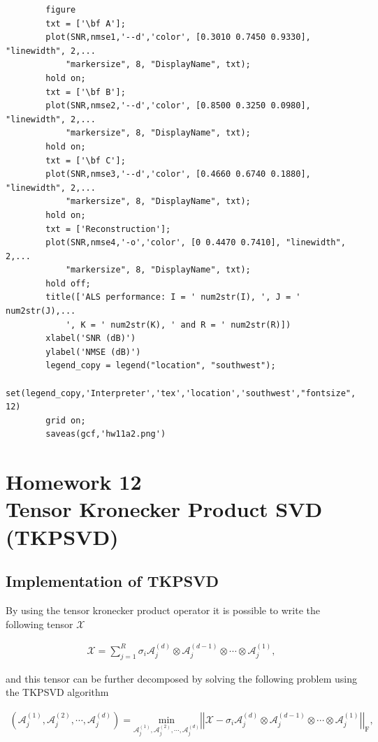 \documentclass[a4paper,10pt]{article}
\begin{document}
\begin{verbatim}
        figure
        txt = ['\bf A'];
        plot(SNR,nmse1,'--d','color', [0.3010 0.7450 0.9330], "linewidth", 2,...
            "markersize", 8, "DisplayName", txt);
        hold on;
        txt = ['\bf B'];
        plot(SNR,nmse2,'--d','color', [0.8500 0.3250 0.0980], "linewidth", 2,...
            "markersize", 8, "DisplayName", txt);
        hold on;
        txt = ['\bf C'];
        plot(SNR,nmse3,'--d','color', [0.4660 0.6740 0.1880], "linewidth", 2,...
            "markersize", 8, "DisplayName", txt);
        hold on;
        txt = ['Reconstruction'];
        plot(SNR,nmse4,'-o','color', [0 0.4470 0.7410], "linewidth", 2,...
            "markersize", 8, "DisplayName", txt);
        hold off;
        title(['ALS performance: I = ' num2str(I), ', J = ' num2str(J),...
            ', K = ' num2str(K), ' and R = ' num2str(R)])
        xlabel('SNR (dB)')
        ylabel('NMSE (dB)')
        legend_copy = legend("location", "southwest");
        set(legend_copy,'Interpreter','tex','location','southwest',"fontsize", 12)
        grid on;
        saveas(gcf,'hw11a2.png')
    \end{verbatim}
    
\newpage
\section*{Homework 12 \\ Tensor Kronecker Product SVD (TKPSVD)}

    \subsection*{Implementation of TKPSVD}

    By using the tensor kronecker product operator it is possible to write the following tensor $\mathcal{X}$

    \begin{align}
        \mathcal{X} = \sum^{R}_{j = 1} \sigma_{i} \mathcal{A}^{(d)}_{j} \otimes \mathcal{A}^{(d - 1)}_{j}  \otimes \cdots \otimes \mathcal{A}^{(1)}_{j},  
    \end{align}
    
    and this tensor can be further decomposed by solving the following problem using the TKPSVD algorithm

    \begin{align}
        \left( \mathcal{A}^{(1)}_{j}, \mathcal{A}^{(2)}_{j}, \cdots, \mathcal{A}^{(d)}_{j} \right) = \underset{\mathcal{A}^{(1)}_{j}, \mathcal{A}^{(2)}_{j}, \cdots, \mathcal{A}^{(d)}_{j}}{\text{min}} \left| \left| \mathcal{X} - \sigma_{i} \mathcal{A}^{(d)}_{j} \otimes \mathcal{A}^{(d-1)}_{j} \otimes \cdots \otimes \mathcal{A}^{(1)}_{j} \right| \right|_{\text{F}},
    \end{align}
\end{document}
